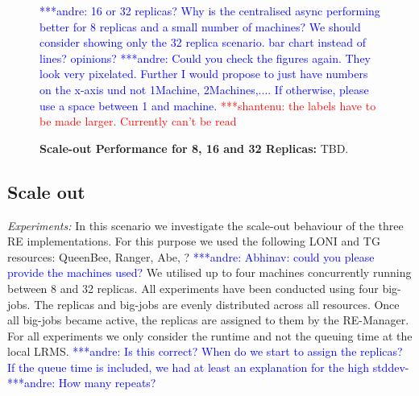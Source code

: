 \documentclass{rspublic}
\newcommand{\jhanote}[1]{ {\textcolor{red} { ***shantenu: #1 }}}
\newcommand{\alnote}[1]{ {\textcolor{blue} { ***andre: #1 }}}
\newcommand{\alnote}[1]{}
\newcommand{\jhanote}[1]{}
\begin{document}
{%
\begin{figure}%
\centering
{}\qquad
\caption{\textbf{Scale-out Performance for 8, 16 and 32 Replicas:} 
  TBD.}
\alnote{16 or 32 replicas? Why is the centralised async performing
  better for 8 replicas and a small number of machines? We should
  consider showing only the 32 replica scenario. bar chart instead of
  lines? opinions?}  \alnote{Could you check the figures again. They
  look very pixelated. Further I would propose to just have numbers on
  the x-axis und not 1Machine, 2Machines,.... If otherwise, please use
  a space between 1 and machine.} \jhanote{the labels have to be made
  larger. Currently can't be read}
\label{fig:24machines}

\end{figure}

\subsection{Scale out}

{\it Experiments:} In this scenario we investigate the scale-out behaviour
of the three RE implementations. For this purpose we used the following
LONI and TG resources: QueenBee, Ranger, Abe, ?\alnote{Abhinav: could you
please provide the machines used?}  We utilised up to four machines concurrently
running between 8 and 32 replicas. All experiments have been conducted using four big-jobs.
The replicas and big-jobs are evenly distributed across all resources. Once all big-jobs became 
active, the replicas are assigned to them by the RE-Manager. For all
experiments we only consider the runtime and not the queuing time at the local 
LRMS. \alnote{Is this correct? When do we start to assign the replicas? If the 
queue time is included, we had at least an explanation for the high stddev-}
\alnote{How many repeats?}

}
\end{document}
